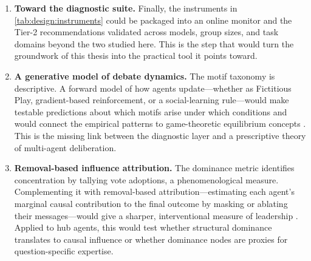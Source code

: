 \begin{enumerate}
  \item \textbf{Toward the diagnostic suite.} Finally, the \suitename{} instruments
        in \autoref{tab:design:instruments} could be packaged into an online monitor
        and the Tier-2 recommendations validated across models, group sizes, and
        task domains beyond the two studied here. This is the step that would turn
        the groundwork of this thesis into the practical tool it points toward.

  \item \textbf{A generative model of debate dynamics.} The motif taxonomy is
        descriptive. A forward model of how agents update---whether as Fictitious
        Play, gradient-based reinforcement, or a social-learning rule---would make
        testable predictions about which motifs arise under which conditions and
        would connect the empirical patterns to game-theoretic equilibrium concepts
        \citep{mehdizadeh2026topologymemory}. This is the missing link between the
        diagnostic layer and a prescriptive theory of multi-agent deliberation.

  \item \textbf{Removal-based influence attribution.} The dominance metric
        identifies concentration by tallying vote adoptions, a phenomenological
        measure. Complementing it with removal-based attribution---estimating each
        agent's marginal causal contribution to the final outcome by masking or
        ablating their messages---would give a sharper, interventional measure of
        leadership \citep{agentsthatmatter2026, cui2025introspecloo, infodynamics2026}.
        Applied to hub agents, this would test whether structural dominance translates
        to causal influence or whether dominance nodes are proxies for
        question-specific expertise.
\end{enumerate}
